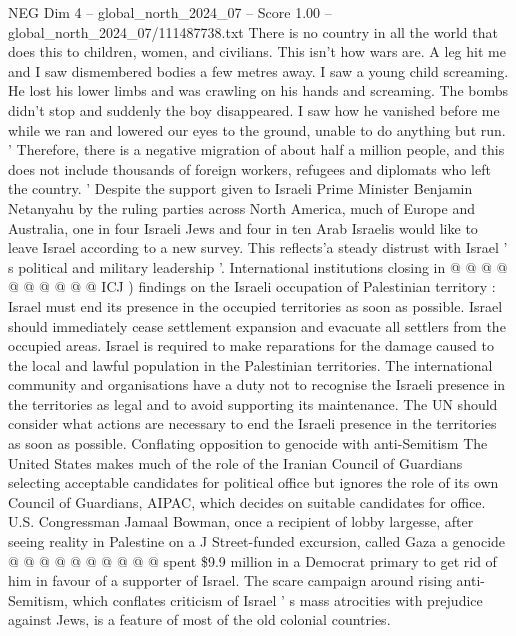 \begin{textsample}{NEG Dim 4 – global\_north\_2024\_07 – Score 1.00 – global\_north\_2024\_07/111487738.txt}  \label{ex:f4_neg_286}
There is no country in all the world that does this to children, women, and civilians.
This isn't how wars are.
A leg hit me and I saw dismembered bodies a few metres away.
I saw a young child screaming.
He lost his lower limbs and was crawling on his hands and screaming.
The bombs didn't stop and suddenly the boy disappeared.
I saw how he vanished before me while we ran and lowered our eyes to the ground, unable to do anything but run. ' Therefore, there is a negative migration of about half a million people, and this does not include thousands of foreign workers, refugees and diplomats who left the country. ' Despite the support given to Israeli Prime Minister Benjamin Netanyahu by the ruling parties across North America, much of Europe and Australia, one in four Israeli Jews and four in ten Arab Israelis would like to leave Israel according to a new survey.
This reflects'a steady distrust with Israel ' s political and military leadership '.
International institutions closing in @ @ @ @ @ @ @ @ @ @ ICJ ) findings on the Israeli occupation of Palestinian territory : Israel must end its presence in the occupied territories as soon as possible.
Israel should immediately cease settlement expansion and evacuate all settlers from the occupied areas.
Israel is required to make reparations for the damage caused to the local and lawful population in the Palestinian territories.
The international community and organisations have a duty not to recognise the Israeli presence in the territories as legal and to avoid supporting its maintenance.
The UN should consider what actions are necessary to end the Israeli presence in the territories as soon as possible.
Conflating opposition to genocide with anti-Semitism The United States makes much of the role of the Iranian Council of Guardians selecting acceptable candidates for political office but ignores the role of its own Council of Guardians, AIPAC, which decides on suitable candidates for office.
U.S.
Congressman Jamaal Bowman, once a recipient of lobby largesse, after seeing reality in Palestine on a J Street-funded excursion, called Gaza a genocide @ @ @ @ @ @ @ @ @ @ spent \$9.9 million in a Democrat primary to get rid of him in favour of a supporter of Israel.
The scare campaign around rising anti-Semitism, which conflates criticism of Israel ' s mass atrocities with prejudice against Jews, is a feature of most of the old colonial countries.

\end{textsample}
